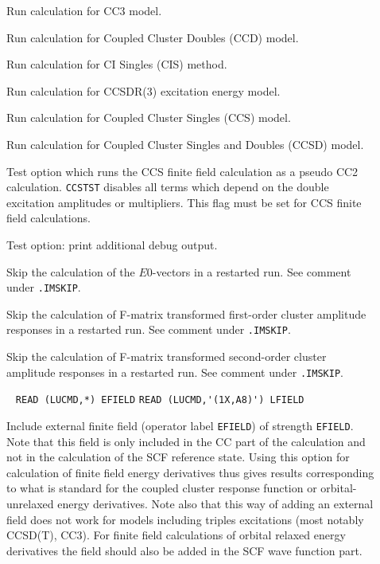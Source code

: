 \begin{description}
\item[]     
        Run calculation for CC3 model.
%
\item[]    
        Run calculation for Coupled Cluster Doubles
        (CCD) model. 
%
\item[]    
        Run calculation for CI Singles (CIS) method. 
%
\item[] 
        Run calculation for CCSDR(3) excitation energy model.
%
\item[] 
        Run calculation for Coupled Cluster Singles
        (CCS) model. 
         
%
\item[]   
        Run calculation for Coupled Cluster Singles and Doubles
        (CCSD) model. 
%
\item[] 
   Test option which runs the CCS finite field calculation as a pseudo CC2
   calculation. \verb+CCSTST+ disables all terms which depend on the
   double excitation amplitudes or multipliers. This flag must be
   set for CCS finite field calculations.
%
\item[]  
   Test option: print additional debug output.
%
\item[] 
   Skip the calculation of the $E0$-vectors 
   in a restarted run. See comment under \verb|.IMSKIP|.
%
\item[] 
   Skip the calculation of F-matrix transformed first-order
   cluster amplitude responses in a restarted run. See comment under \verb|.IMSKIP|.
%
\item[] 
   Skip the calculation of F-matrix transformed second-order
   cluster amplitude responses in a restarted run. See comment under \verb|.IMSKIP|.
%
\item[] \verb| |\newline
    \verb|READ (LUCMD,*) EFIELD|\newline
    \verb|READ (LUCMD,'(1X,A8)') LFIELD|

    Include external finite field (operator label \verb+EFIELD+)
    of strength \verb+EFIELD+. Note that this field is only included
    in the CC part of the calculation and not in the calculation of the
    SCF reference state. Using this option for calculation of finite field energy
    derivatives thus gives results corresponding to what is standard for the coupled cluster
    response function or orbital-unrelaxed energy derivatives.
    Note also that this way of adding an external field does not work for models including
    triples excitations (most notably CCSD(T), CC3).
    For finite field calculations of orbital relaxed energy derivatives the field
    should also be added in the SCF wave function part.
 

\end{description}
